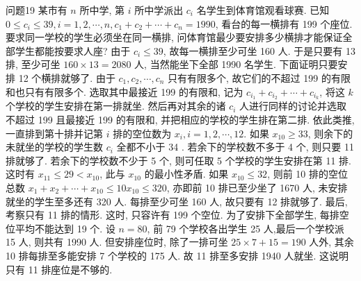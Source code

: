 问题19 某市有 $n$ 所中学, 第 $i$ 所中学派出 $c_i$ 名学生到体育馆观看球赛.
已知 $0 \leqslant c_i \leqslant 39, i=1,2, \cdots, n, c_1+c_2+\cdots+c_n=1990$, 看台的每一横排有 199 个座位.
要求同一学校的学生必须坐在同一横排, 问体育馆最少要安排多少横排才能保证全部学生都能按要求人座?
由于 $c_i \leqslant 39$, 故每一横排至少可坐 160 人.
于是只要有 13 排, 至少可坐 $160 \times 13=2080$ 人, 当然能坐下全部 1990 名学生.
下面证明只要安排 12 个横排就够了.
由于 $c_1, c_2, \cdots, c_n$ 只有有限多个, 故它们的不超过 199 的有限和也只有有限多个.
选取其中最接近 199 的有限和, 记为 $c_{i_1}+c_{i_2}+\cdots+c_{i_k}$, 将这 $k$ 个学校的学生安排在第一排就坐.
然后再对其余的诸 $c_i$ 人进行同样的讨论并选取不超过 199 且最接近 199 的有限和, 并把相应的学校的学生排在第二排.
依此类推,一直排到第十排并记第 $i$ 排的空位数为 $x_i, i=1,2, \cdots, 12$.
如果 $x_{10} \geqslant 33$, 则余下的未就坐的学校的学生数 $c_i$ 全都不小于 34 . 若余下的学校数不多于 4 个, 则只要 11 排就够了.
若余下的学校数不少于 5 个, 则可任取 5 个学校的学生安排在第 11 排.
这时有 $x_{11} \leqslant 29<x_{10}$, 此与 $x_{10}$ 的最小性矛盾.
如果 $x_{10} \leqslant 32$, 则前 10 排的空位总数 $x_1+x_2+\cdots+x_{10} \leqslant 10 x_{10} \leqslant 320$, 亦即前 10 排已至少坐了 1670 人, 未安排就坐的学生至多还有 320 人.
每排至少可坐 160 人, 故只要有 12 排就够了.
最后, 考察只有 11 排的情形.
这时, 只容许有 199 个空位.
为了安排下全部学生, 每排空位平均不能达到 19 个.
设 $n=80$, 前 79 个学校各出学生 25 人,最后一个学校派 15 人, 则共有 1990 人.
但安排座位时, 除了一排可坐 $25 \times 7+15=190$ 人外, 其余 10 排每排至多能安排 7 个学校的 175 人.
故 11 排至多安排 1940 人就坐.
这说明只有 11 排座位是不够的.



